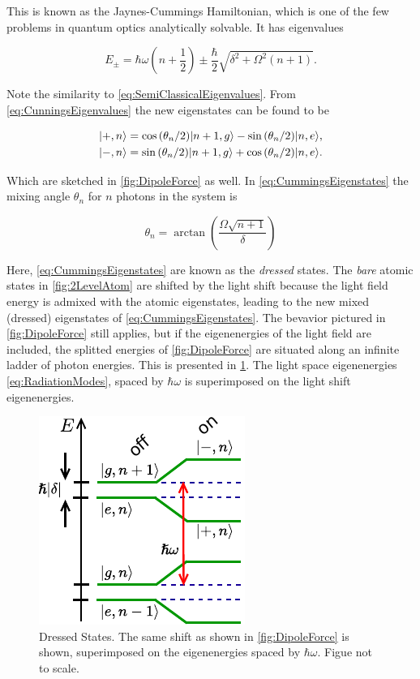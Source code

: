 This is known as the Jaynes-Cummings Hamiltonian, which is one of the few problems in quantum optics analytically solvable. It has eigenvalues \cite{Hussin2005}

\begin{equation}\label{eq:CunningsEigenvalues}
    E_{\pm} = \hbar\omega\left(n+\frac{1}{2}\right) \pm \frac{\hbar}{2} \sqrt{\delta^2 + \Omega^2(n+1)}.
\end{equation}

Note the similarity to \cref{eq:SemiClassicalEigenvalues}. From \cref{eq:CunningsEigenvalues} the new eigenstates can be found to be \cite{Hussin2005}

\begin{subequations}\label{eq:CummingsEigenstates}
    \begin{align}
        \lvert+,n\rangle &= \cos{({\theta_n}/2)} \lvert n+1,g\rangle -\sin{(\theta_n/2)} \lvert n,e\rangle, \\
        \lvert-,n\rangle &= \sin{(\theta_n/2)}\lvert n+1,g\rangle + \cos{(\theta_n/2)} \lvert n,e\rangle.
    \end{align}
\end{subequations}

Which are sketched in \cref{fig:DipoleForce} as well. In \cref{eq:CummingsEigenstates} the mixing angle $\theta_n$ for $n$ photons in the system is

\begin{equation}
    \theta_n = \arctan{\left(
        \frac{\Omega\sqrt{n+1}}{\delta}
    \right)}
\end{equation}

Here, \cref{eq:CummingsEigenstates} are known as the \emph{dressed} states. The \emph{bare} atomic states in \cref{fig:2LevelAtom} are shifted by the light shift because the light field energy is admixed with the atomic eigenstates, leading to the new mixed (dressed) eigenstates of \cref{eq:CummingsEigenstates}. The bevavior pictured in \cref{fig:DipoleForce} still applies, but if the eigenenergies of the light field are included, the splitted energies of \cref{fig:DipoleForce} are situated along an infinite ladder of photon energies. This is presented in \cref{fig:DressedStatePicture}. The light space eigenenergies \cref{eq:RadiationModes}, spaced by $\hbar \omega$ is superimposed on the light shift eigenenergies. 

\begin{figure}
    \centering
    \includegraphics[width=0.31\linewidth]{figures/DressedStates.pdf}
    \caption{Dressed States. The same shift as shown in \cref{fig:DipoleForce} is shown, superimposed on the  eigenenergies spaced by $\hbar \omega$. Figue not to scale. }
    \label{fig:DressedStatePicture}
\end{figure}


